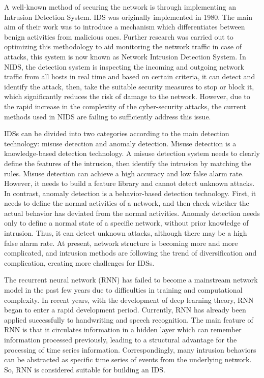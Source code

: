 A well-known method of securing the network is through implementing an Intrusion Detection System. IDS was originally implemented in 1980. The main aim of their work was to introduce a mechanism which differentiates between benign activities from malicious ones. Further research was carried out to optimizing this methodology to aid monitoring the network traffic in case of attacks, this system is now known as Network Intrusion Detection System. In NIDS, the detection system is inspecting the incoming and outgoing network traffic from all hosts in real time and based on certain criteria, it can detect and identify the attack, then, take the suitable security measures to stop or block it, which significantly reduces the risk of damage to the network. However, due to the rapid increase in the complexity of the cyber-security attacks, the current methods used in NIDS are failing to sufficiently address this issue\cite{al2020using}.
\par 
IDSs can be divided into two categories according to the main detection technology: misuse detection and anomaly detection. Misuse detection is a knowledge-based detection technology. A misuse detection system needs to clearly define the features of the intrusion, then identify the intrusion by matching the rules. Misuse detection can achieve a high accuracy and low false alarm rate. However, it needs to build a feature library and cannot detect unknown attacks. In contrast, anomaly detection is a behavior-based detection technology. First, it needs to define the normal activities of a network, and then check whether the actual behavior has deviated from the normal activities. Anomaly detection needs only to define a normal state of a specific network, without prior knowledge of intrusion. Thus, it can detect unknown attacks, although there may be a high false alarm rate. At present, network structure is becoming more and more complicated, and intrusion methods are following the trend of diversification and complication, creating more challenges for IDSs.\par 
The recurrent neural network (RNN) has failed to become a mainstream network model in the past few years due to difficulties in training and computational complexity. In recent years, with the development of deep learning theory, RNN began to enter a rapid development period. Currently, RNN has already been applied successfully to handwriting and speech recognition. The main feature of RNN is that it circulates information in a hidden layer which can remember information processed previously, leading to a structural advantage for the processing of time series information. Correspondingly, many intrusion behaviors can be abstracted as specific time series of events from the underlying network. So, RNN is considered suitable for building an IDS\cite{xu2018intrusion}.
\par 
